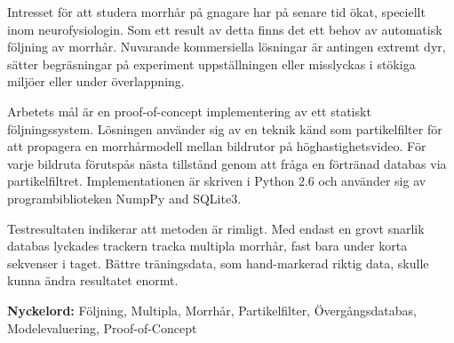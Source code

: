 
Intresset för att studera morrhår på gnagare har på senare tid ökat, speciellt inom neurofysiologin.
Som ett result av detta finns det ett behov av automatisk följning av morrhår.
Nuvarande kommersiella lösningar är antingen extremt dyr, sätter begräsningar på experiment uppställningen
eller misslyckas i stökiga miljöer eller under överlappning.

Arbetets mål är en proof-of-concept implementering av ett statiskt följningssystem. 
Lösningen använder sig av 
en teknik känd som partikelfilter för att propagera en morrhårmodell mellan bildrutor 
på höghastighetsvideo.
För varje bildruta förutspås nästa tillstånd genom att fråga en förtränad databas 
via partikelfiltret. 
Implementationen är skriven i Python 2.6 och använder sig av programbiblioteken NumpPy\cite{NumPy} and SQLite3\cite{SQLite3}.

Testresultaten indikerar att metoden är rimligt. 
Med endast en grovt snarlik databas lyckades trackern 
tracka multipla morrhår, fast bara under korta sekvenser i taget. 
Bättre träningsdata, som hand-markerad riktig data, skulle kunna ändra resultatet enormt.


\textbf{Nyckelord:} Följning, Multipla, Morrhår, Partikelfilter, Övergångsdatabas, Modelevaluering, Proof-of-Concept
